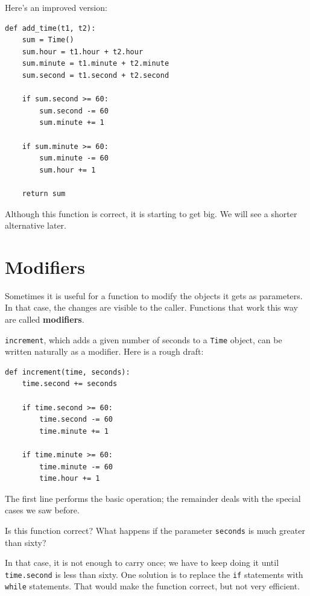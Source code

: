 \documentclass[10pt]{book}
\begin{document}

Here's an improved version:

\beforeverb
\begin{verbatim}
def add_time(t1, t2):
    sum = Time()
    sum.hour = t1.hour + t2.hour
    sum.minute = t1.minute + t2.minute
    sum.second = t1.second + t2.second

    if sum.second >= 60:
        sum.second -= 60
        sum.minute += 1

    if sum.minute >= 60:
        sum.minute -= 60
        sum.hour += 1

    return sum
\end{verbatim}
\afterverb
%
Although this function is correct, it is starting to get big.
We will see a shorter alternative later.


\section{Modifiers}
\label{increment}


Sometimes it is useful for a function to modify the objects it gets as
parameters.  In that case, the changes are visible to the caller.
Functions that work this way are called {\bf modifiers}.


{\tt increment}, which adds a given number of seconds to a {\tt Time}
object, can be written naturally as a
modifier.  Here is a rough draft:

\beforeverb
\begin{verbatim}
def increment(time, seconds):
    time.second += seconds

    if time.second >= 60:
        time.second -= 60
        time.minute += 1

    if time.minute >= 60:
        time.minute -= 60
        time.hour += 1
\end{verbatim}
\afterverb
%
The first line performs the basic operation; the remainder deals
with the special cases we saw before.


Is this function correct?  What happens if the parameter {\tt seconds}
is much greater than sixty?  

In that case, it is not enough to carry
once; we have to keep doing it until {\tt time.second} is less than sixty.
One solution is to replace the {\tt if} statements with {\tt while}
statements.  That would make the function correct, but not
very efficient.
\end{document}
